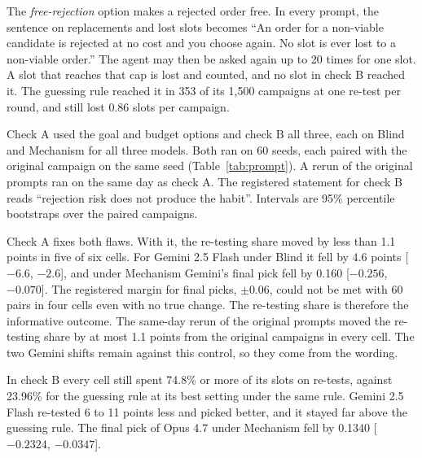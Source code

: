 The \emph{free-rejection} option makes a rejected order free. In every prompt, the sentence on replacements and lost slots becomes
``An order for a non-viable candidate is rejected at no cost and you choose again. No slot is ever lost to a
non-viable order.'' The agent may then be asked again up to 20 times for one slot. A slot that reaches that cap
is lost and counted, and no slot in check B reached it. The guessing rule reached it in 353 of
its 1{,}500 campaigns at one re-test per round, and still lost 0.86 slots per campaign.

Check A used the goal and budget options and check B all three, each on Blind and Mechanism for all three models. Both ran on 60 seeds, each paired with the original campaign on the same seed (Table~\ref{tab:prompt}). A rerun of the original prompts ran on the same day as check A. The registered statement for check B reads ``rejection risk does not produce the habit''. Intervals are 95\% percentile bootstraps over the paired
campaigns.

Check A fixes both flaws. With it, the re-testing share moved by less than 1.1 points in five of six cells. For Gemini 2.5 Flash under Blind it fell by 4.6 points [$-6.6$, $-2.6$],
and under Mechanism Gemini's final pick fell by 0.160 [$-0.256$, $-0.070$]. The registered margin for final picks,
$\pm 0.06$, could not be met with 60 pairs in four cells even with no true change. The re-testing share is
therefore the informative outcome. The same-day rerun of the original prompts moved the re-testing share by at most 1.1 points from the original campaigns in every cell. The two Gemini shifts remain against this
control, so they come from the wording.




In check B every cell still spent 74.8\% or more of its slots on re-tests, against 23.96\% for
the guessing rule at its best setting under the same rule. Gemini 2.5 Flash re-tested 6 to 11 points less and picked better, and it stayed far above the
guessing rule. The final pick of Opus 4.7 under Mechanism fell by 0.1340 [$-0.2324$, $-0.0347$].
